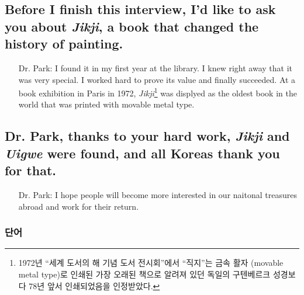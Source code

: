 \documentclass[9pt, a4paper]{oblivoir}
\begin{document}
    \subsection*{Before I finish this interview, I'd like to ask you about \emph{Jikji}, a book that changed the history of painting.}

    \begin{itemize}
        \item[Dr. Park:] I found it in my first year at the library. I knew right away that it was very special. 
        I worked hard to prove its value and finally succeeded. At a book exhibition in Paris in 1972, \emph{Jikji}\footnote{1972년 ``세계 도서의 해 기념 도서 전시회''에서 ``직지''는 금속 활자 (movable metal type)로 인쇄된 가장 오래된 책으로 알려져 있던 독일의 구텐베르크 성경보다 78년 앞서 인쇄되었음을 인정받았다.} was displyed as the oldest book in the world that was printed with movable metal type.
    \end{itemize}

    \subsection*{Dr. Park, thanks to your hard work, \emph{Jikji} and \emph{Uigwe} were found, and all Koreas thank you for that.}

    \begin{itemize}
        \item[Dr. Park:] I hope people will become more interested in our naitonal treasures abroad and work for their return.
    \end{itemize}
    \vspace*{0.5cm}
    \subsubsection*{단어}
\end{document}

